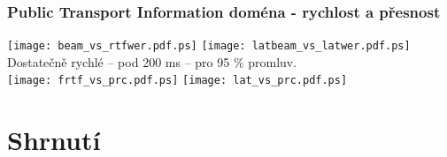 \begin{frame}\frametitle{Public Transport Information doména - rychlost a přesnost} 
    \texttt{[image: beam\_vs\_rtfwer.pdf.ps]}
    \texttt{[image: latbeam\_vs\_latwer.pdf.ps]}
    \\  Dostatečně rychlé -- pod 200 ms -- pro 95 \% promluv. \\
    \texttt{[image: frtf\_vs\_prc.pdf.ps]}
    \texttt{[image: lat\_vs\_prc.pdf.ps]}
\end{frame}


\section{Shrnutí} %


